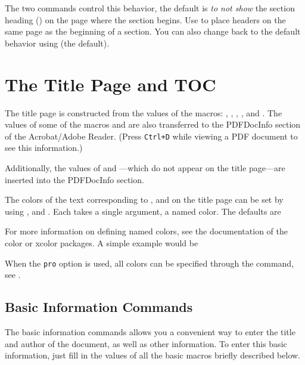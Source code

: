\documentclass{article}
\def\PDF{\textsf{PDF}}
\begin{document}
The two commands control this behavior, the default is \emph{to not
show} the section heading () on the page where the
section begins. Use  to place headers on
the same page as the beginning of a section. You can also change back to
the default behavior using  (the default).


\section{The Title Page and TOC}

The title page is constructed from the values of the macros:
, , , , and
.  The values of some of the macros  and
 are also transferred to the PDFDocInfo section of the
Acrobat/Adobe Reader. (Press \texttt{Ctrl+D} while viewing a \PDF{} document
to see this information.)

Additionally, the values of  and ---which
do not appear on the title page---are inserted into the PDFDocInfo
section.

\newtopic The colors of the text corresponding to ,  and  on the title
page can be set by using ,  and .
Each takes a single argument, a named color. The defaults are
\begin{sverbatim}
\end{sverbatim}
For more information on defining named \textsf{colors}, see the documentation
of the color or \textsf{xcolor} packages. A simple example would be
\begin{sverbatim}
\end{sverbatim}

\redpoint When the \texttt{pro} option is used, all colors can be specified through the 
command, see .

\subsection{Basic Information Commands}\label{ss:BIM}

The basic information commands allows you a convenient way to enter the title and author
of the document, as well as other information. To enter this basic information,
just fill in the values of all the basic macros briefly described below.
\end{document}
